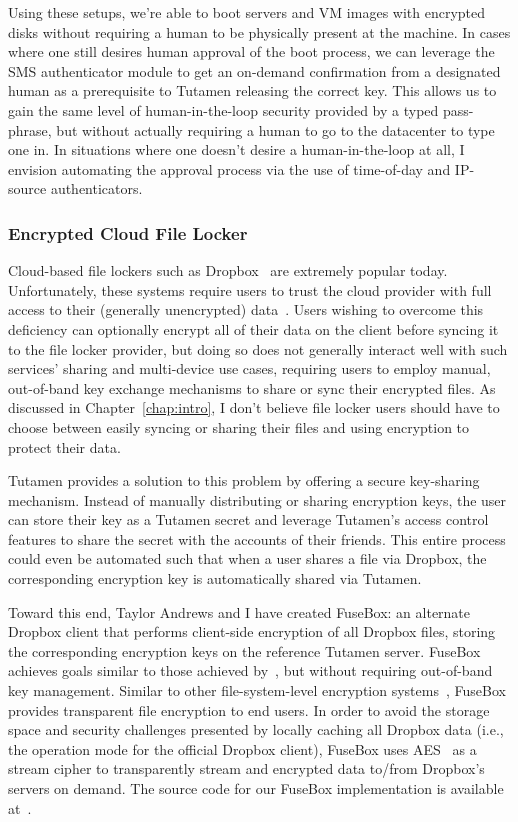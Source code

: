 Using these setups, we're able to boot servers and VM images with
encrypted disks without requiring a human to be physically present at
the machine. In cases where one still desires human approval of the
boot process, we can leverage the SMS authenticator module to get an
on-demand confirmation from a designated human as a prerequisite to
Tutamen releasing the correct key. This allows us to gain the same
level of human-in-the-loop security provided by a typed pass-phrase,
but without actually requiring a human to go to the datacenter to type
one in. In situations where one doesn't desire a human-in-the-loop at
all, I envision automating the approval process via the use of
time-of-day and IP-source authenticators.

\subsubsection{Encrypted Cloud File Locker}

Cloud-based file lockers such as Dropbox~\cite{dropbox} are extremely
popular today. Unfortunately, these systems require users to trust the
cloud provider with full access to their (generally unencrypted)
data~\cite{vintsurf-dropbox}. Users wishing to overcome this
deficiency can optionally encrypt all of their data on the client
before syncing it to the file locker provider, but doing so does not
generally interact well with such services' sharing and multi-device
use cases, requiring users to employ manual, out-of-band key exchange
mechanisms to share or sync their encrypted files. As discussed in
Chapter~\ref{chap:intro}, I don't believe file locker users should
have to choose between easily syncing or sharing their files and using
encryption to protect their data.

Tutamen provides a solution to this problem by offering a secure
key-sharing mechanism. Instead of manually distributing or sharing
encryption keys, the user can store their key as a Tutamen secret and
leverage Tutamen's access control features to share the secret with
the accounts of their friends. This entire process could even be
automated such that when a user shares a file via Dropbox, the
corresponding encryption key is automatically shared via Tutamen.

Toward this end, Taylor Andrews and I have created FuseBox: an
alternate Dropbox client that performs client-side encryption of all
Dropbox files, storing the corresponding encryption keys on the
reference Tutamen server. FuseBox achieves goals similar to those
achieved by~\cite{goh2003}, but without requiring out-of-band key
management. Similar to other file-system-level encryption
systems~\cite{blaze1993, Cattaneo2001, halcrow}, FuseBox provides
transparent file encryption to end users. In order to avoid the
storage space and security challenges presented by locally caching all
Dropbox data (i.e., the operation mode for the official Dropbox
client), FuseBox uses AES~\cite{daemen1999, nist2001} as a stream
cipher to transparently stream and encrypted data to/from Dropbox's
servers on demand.  The source code for our FuseBox implementation is
available at~\cite{fusebox}.

